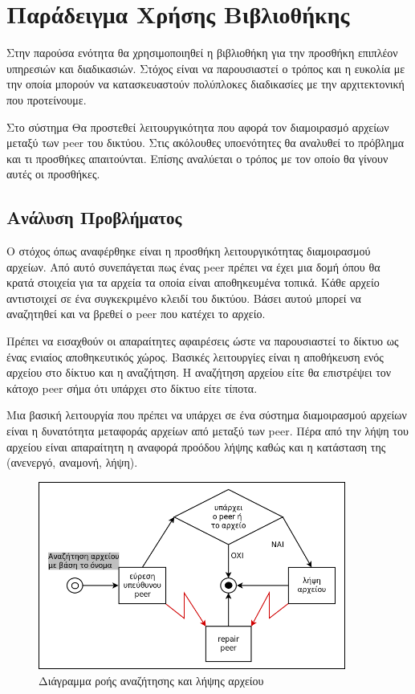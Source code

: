 \chapter{Παράδειγμα Χρήσης Βιβλιοθήκης}
\label{chap:Demo}

Στην παρούσα ενότητα θα χρησιμοποιηθεί η βιβλιοθήκη για την 
προσθήκη επιπλέον υπηρεσιών και διαδικασιών. Στόχος είναι να 
παρουσιαστεί ο τρόπος και η ευκολία με την οποία μπορούν να 
κατασκευαστούν πολύπλοκες διαδικασίες με την αρχιτεκτονική που 
προτείνουμε.

Στο σύστημα Θα προστεθεί λειτουργικότητα που αφορά τον 
διαμοιρασμό αρχείων μεταξύ των peer του δικτύου. Στις ακόλουθες 
υποενότητες θα αναλυθεί το πρόβλημα και τι προσθήκες απαιτούνται. Επίσης 
αναλύεται ο τρόπος με τον οποίο θα γίνουν αυτές οι προσθήκες.

\section{Ανάλυση Προβλήματος}

Ο στόχος όπως αναφέρθηκε είναι η προσθήκη λειτουργικότητας 
διαμοιρασμού αρχείων. Από αυτό συνεπάγεται πως ένας peer πρέπει να έχει 
μια δομή όπου θα κρατά στοιχεία για τα αρχεία τα οποία είναι 
αποθηκευμένα τοπικά. Κάθε αρχείο αντιστοιχεί σε ένα συγκεκριμένο κλειδί 
του δικτύου. Βάσει αυτού μπορεί να αναζητηθεί και να βρεθεί ο peer που 
κατέχει το αρχείο.

Πρέπει να εισαχθούν οι απαραίτητες αφαιρέσεις ώστε να 
παρουσιαστεί το δίκτυο ως ένας ενιαίος αποθηκευτικός χώρος. Βασικές 
λειτουργίες είναι η αποθήκευση ενός αρχείου στο δίκτυο και η αναζήτηση. 
Η αναζήτηση αρχείου είτε θα επιστρέψει τον κάτοχο peer σήμα ότι υπάρχει 
στο δίκτυο είτε τίποτα.

Μια βασική λειτουργία που πρέπει να υπάρχει σε ένα σύστημα διαμοιρασμού 
αρχείων είναι η δυνατότητα μεταφοράς αρχείων από μεταξύ των peer. Πέρα 
από την λήψη του αρχείου είναι απαραίτητη η αναφορά προόδου λήψης καθώς 
και η κατάσταση της (ανενεργό, αναμονή, λήψη). 

\begin{figure}[htbp]
  \begin{center}
    \includegraphics[width=0.9\textwidth]{Figures/Demo/Workflow.png}
  \end{center}
  \caption{Διάγραμμα ροής αναζήτησης και λήψης αρχείου}
  \label{fig:Workflow}
\end{figure}


